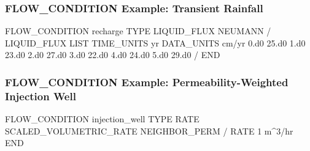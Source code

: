\begin{frame}[fragile]\frametitle{FLOW\_CONDITION Example: Transient Rainfall}

\begin{semiverbatim}
FLOW_CONDITION recharge
  TYPE
    LIQUID_FLUX NEUMANN
  /
  LIQUID_FLUX LIST
    TIME_UNITS yr
    DATA_UNITS cm/yr
    0.d0 25.d0
    1.d0 23.d0
    2.d0 27.d0
    3.d0 22.d0
    4.d0 24.d0
    5.d0 29.d0
  /
END
\end{semiverbatim}

\end{frame}

\begin{frame}[fragile]\frametitle{FLOW\_CONDITION Example: Permeability-Weighted Injection Well}

\begin{semiverbatim}
FLOW_CONDITION injection_well
  TYPE
    RATE SCALED_VOLUMETRIC_RATE NEIGHBOR_PERM
  /
  RATE 1 m^3/hr
END
\end{semiverbatim}

\end{frame}
